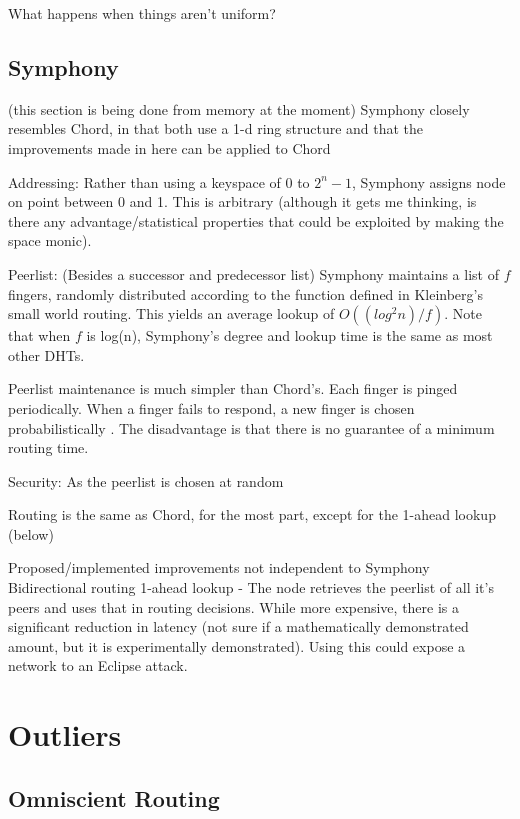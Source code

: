 \documentclass[10pt,letterpaper]{report}
\begin{document}
\cite{kleinberg2000navigation}
\cite{kleinberg2000small}


What happens when things aren't uniform?
\section{Symphony}

(this section is being done from memory at the moment)
Symphony closely resembles Chord, in that both use a 1-d ring structure and that the improvements made in here can be applied to Chord

Addressing:  Rather than using a keyspace of 0 to $2^n - 1$, Symphony assigns node on point between 0 and 1.  This is arbitrary (although it gets me thinking, is there any advantage/statistical properties   that could be exploited by making the space monic).

Peerlist:  (Besides a successor and predecessor list) Symphony maintains a list of $f$ fingers, randomly distributed according to the function defined in Kleinberg's small world routing.  This yields an average lookup of $O((log^{2} n)/f)$.  Note that when $f$ is log(n), Symphony's degree and lookup time is the same as most other DHTs.  

Peerlist maintenance is much simpler than Chord's.  Each finger is pinged periodically.  When a finger fails to respond, a new finger is chosen probabilistically .  The disadvantage is that there is no guarantee of a minimum routing time.

Security:  As the peerlist is chosen at random

Routing  is the same as Chord, for the most part, except for the 1-ahead lookup (below)



Proposed/implemented improvements not independent to Symphony
Bidirectional routing
1-ahead lookup - The node retrieves the peerlist of all it's peers and uses that in routing decisions.  While more expensive, there is a significant reduction in latency (not sure if a mathematically demonstrated amount, but it is experimentally demonstrated).  Using this could expose a network to an Eclipse attack.


\chapter{Outliers}
\section{Omniscient Routing}
\end{document}
